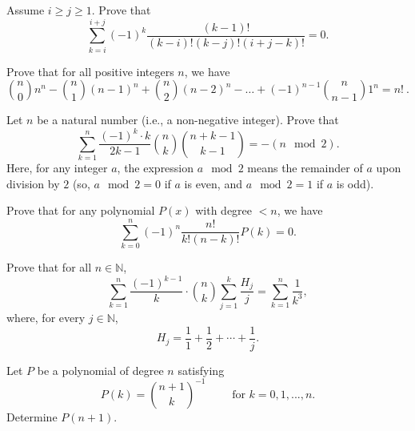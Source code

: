 \begin{question}
    Assume $i\geq j\geq 1$. Prove that
    \[\sum_{k=i}^{i+j} (-1)^k\frac{(k-1)!}{(k-i)!(k-j)!(i+j-k)!}=0.\]
\end{question}



\begin{question}
    Prove that for all positive integers $n$, we have \[ \binom{n}{0} n^n - \binom{n}{1} (n-1)^n + \binom{n}{2} (n-2)^n - \ldots + (-1)^{n-1} \binom{n}{n-1} 1^n = n! \ .\]
\end{question}

\begin{question}
    Let $n$ be a natural number (i.e., a non-negative integer). Prove that \[\sum_{k = 1}^n \frac {\left( - 1\right)^k\cdot k}{2k - 1}\binom{n}{k}\binom{n + k - 1}{k - 1} = - \left(n\mod 2\right).\]
    Here, for any integer $a$, the expression $a \mod 2$ means the remainder of $a$ upon division by $2$ (so, $a \mod 2 = 0$ if $a$ is even, and $a \mod 2 = 1$ if $a$ is odd).
\end{question}


\begin{question}
    Prove that for any polynomial $ P\left(x\right)$ with degree $<n$, we have
    \[\sum_{k = 0}^{n} \left( - 1\right)^n \frac {n!}{k!\left(n - k\right)!}P\left(k\right) = 0.\]
\end{question}

\begin{question}[name={10490 AMM}]
    Prove that for all $ n\in\mathbb{N}$, 
    \[\sum_{k = 1}^{n}\frac {\left( - 1\right)^{k - 1}}{k}\cdot \binom{n}{k}\sum_{j = 1}^{k}\frac {H_{j}}{j} = \sum_{k = 1}^{n}\frac {1}{k^{3}},\]
    where, for every $ j\in\mathbb{N}$,
    \[H_{j} = \frac {1}{1} + \frac {1}{2} + \cdots + \frac {1}{j}.\]
\end{question}

\begin{question}
    Let $P$ be a polynomial of degree $n$ satisfying
\[P(k) = \binom{n+1}{k}^{-1} \qquad \text{ for } k = 0, 1, . . ., n.\]
Determine $P(n + 1).$
\end{question}


